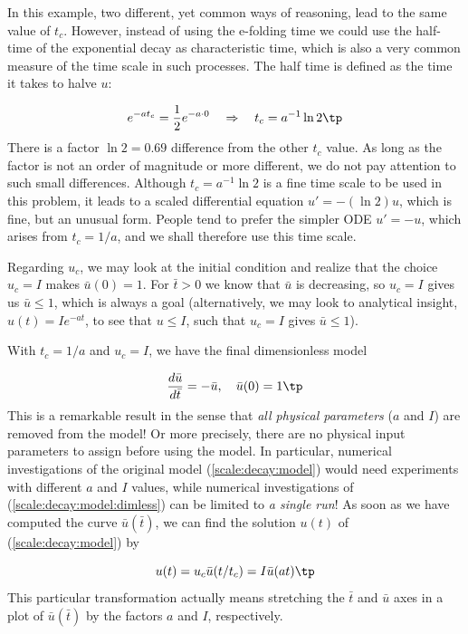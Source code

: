 \documentclass[graybox,envcountchap,sectrefs,final]{svmonodo}
\begin{document}
In this example, two different, yet common ways of reasoning, lead to the
same value of $t_c$. However, instead of using the e-folding time we
could use the half-time of the exponential decay as characteristic
time, which is also a very common measure of the time scale in such
processes. The half time is defined as the time it takes to halve $u$:

\[ e^{-at_c} = \frac{1}{2}e^{-a\cdot 0}
\quad\Rightarrow\quad t_c = a^{-1}\ln 2\tp\]
There is a factor $\ln 2 =0.69$ difference from the other $t_c$ value.
As long as the factor is not an order of magnitude or more different,
we do not pay attention to such small differences.
Although $t_c = a^{-1}\ln 2$ is a fine time scale to be used in this
problem, it leads to a scaled differential equation $u'=-(\ln 2) u$,
which is fine, but an unusual form. People tend to prefer the simpler
ODE $u'=-u$,
which arises from $t_c=1/a$, and we shall therefore use this
time scale.

Regarding $u_c$, we may look at the initial condition
and realize that the choice $u_c=I$ makes $\bar u(0)=1$. For $\bar t>0$
we know that $\bar u$ is decreasing, so $u_c=I$
gives us $\bar u\leq 1$, which is always a goal
(alternatively, we may look to analytical insight, $u(t)=Ie^{-at}$, to
see that $u\leq I$, such that $u_c=I$ gives $\bar u\leq 1$).

With $t_c=1/a$ and $u_c=I$, we have the final dimensionless model

\begin{equation}
\frac{d\bar u}{d\bar t} = -\bar u,\quad \bar u(0)=1
\tp
\label{scale:decay:model:dimless}
\end{equation}
This is a remarkable result in the sense that \emph{all physical parameters}
($a$ and $I$)
are removed from the model! Or more precisely, there are no physical input
parameters to assign
before using the model. In particular, numerical investigations of the original
model (\ref{scale:decay:model}) would need experiments with different
$a$ and $I$ values, while numerical investigations of
(\ref{scale:decay:model:dimless}) can be limited to \emph{a single run}! As soon
as we have computed the curve $\bar u(\bar t)$, we can find the
solution $u(t)$ of (\ref{scale:decay:model}) by

\begin{equation}
u(t) = u_c\bar u(t/t_c) = I\bar u(at)
\tp
\label{scale:decay:u:dim}
\end{equation}
This particular transformation actually means stretching the $\bar t$ and
$\bar u$ axes in a plot of $\bar u(\bar t)$ by the factors $a$ and $I$,
respectively.
\end{document}
